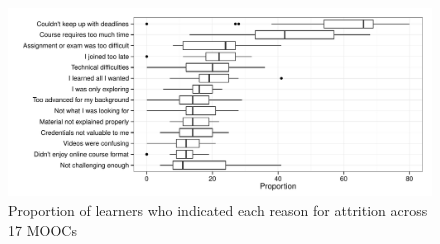 \documentclass{sigchi}\usepackage[]{graphicx}\usepackage[]{color}
\makeatletter
\def\maxwidth{ %
  \ifdim\Gin@nat@width>\linewidth
    \linewidth
  \else
    \Gin@nat@width
  \fi
}
\newenvironment{knitrout}{}{} %
\makeatother
\begin{document}
\begin{knitrout}
\color{fgcolor}\begin{figure}[ht]

\includegraphics[width=\maxwidth]{figure/s1reason} \caption[Proportion of learners who indicated each reason for attrition across 17 MOOCs]{Proportion of learners who indicated each reason for attrition across 17 MOOCs\label{fig:s1reason}}
\end{figure}


\end{knitrout}
\end{document}
